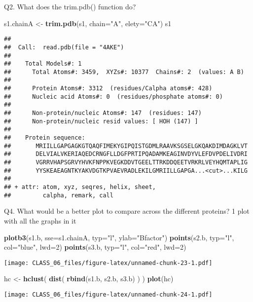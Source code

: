 \documentclass[
]{article}
\newenvironment{Shaded}{\begin{snugshade}}{\end{snugshade}}
\newcommand{\DataTypeTok}[1]{\textcolor[rgb]{0.13,0.29,0.53}{#1}}
\newcommand{\DecValTok}[1]{\textcolor[rgb]{0.00,0.00,0.81}{#1}}
\newcommand{\KeywordTok}[1]{\textcolor[rgb]{0.13,0.29,0.53}{\textbf{#1}}}
\newcommand{\NormalTok}[1]{#1}
\newcommand{\StringTok}[1]{\textcolor[rgb]{0.31,0.60,0.02}{#1}}
\begin{document}
Q2. What does the trim.pdb() function do?

\begin{Shaded}
\begin{Highlighting}[]
\NormalTok{s1.chainA <-}\StringTok{ }\KeywordTok{trim.pdb}\NormalTok{(s1, }\DataTypeTok{chain=}\StringTok{"A"}\NormalTok{, }\DataTypeTok{elety=}\StringTok{"CA"}\NormalTok{)}
\NormalTok{s1}
\end{Highlighting}
\end{Shaded}

\begin{verbatim}
## 
##  Call:  read.pdb(file = "4AKE")
## 
##    Total Models#: 1
##      Total Atoms#: 3459,  XYZs#: 10377  Chains#: 2  (values: A B)
## 
##      Protein Atoms#: 3312  (residues/Calpha atoms#: 428)
##      Nucleic acid Atoms#: 0  (residues/phosphate atoms#: 0)
## 
##      Non-protein/nucleic Atoms#: 147  (residues: 147)
##      Non-protein/nucleic resid values: [ HOH (147) ]
## 
##    Protein sequence:
##       MRIILLGAPGAGKGTQAQFIMEKYGIPQISTGDMLRAAVKSGSELGKQAKDIMDAGKLVT
##       DELVIALVKERIAQEDCRNGFLLDGFPRTIPQADAMKEAGINVDYVLEFDVPDELIVDRI
##       VGRRVHAPSGRVYHVKFNPPKVEGKDDVTGEELTTRKDDQEETVRKRLVEYHQMTAPLIG
##       YYSKEAEAGNTKYAKVDGTKPVAEVRADLEKILGMRIILLGAPGA...<cut>...KILG
## 
## + attr: atom, xyz, seqres, helix, sheet,
##         calpha, remark, call
\end{verbatim}

Q4. What would be a better plot to compare across the different
proteins? 1 plot with all the graphs in it

\begin{Shaded}
\begin{Highlighting}[]
\KeywordTok{plotb3}\NormalTok{(s1.b, }\DataTypeTok{sse=}\NormalTok{s1.chainA, }\DataTypeTok{typ=}\StringTok{"l"}\NormalTok{, }\DataTypeTok{ylab=}\StringTok{"Bfactor"}\NormalTok{)}
\KeywordTok{points}\NormalTok{(s2.b, }\DataTypeTok{typ=}\StringTok{"l"}\NormalTok{, }\DataTypeTok{col=}\StringTok{"blue"}\NormalTok{, }\DataTypeTok{lwd=}\DecValTok{2}\NormalTok{)}
\KeywordTok{points}\NormalTok{(s3.b, }\DataTypeTok{typ=}\StringTok{"l"}\NormalTok{, }\DataTypeTok{col=}\StringTok{"red"}\NormalTok{, }\DataTypeTok{lwd=}\DecValTok{2}\NormalTok{)}
\end{Highlighting}
\end{Shaded}

\texttt{[image: CLASS\_06\_files/figure-latex/unnamed-chunk-23-1.pdf]}

\begin{Shaded}
\begin{Highlighting}[]
\NormalTok{hc <-}\StringTok{ }\KeywordTok{hclust}\NormalTok{( }\KeywordTok{dist}\NormalTok{( }\KeywordTok{rbind}\NormalTok{(s1.b, s2.b, s3.b) ) )}
\KeywordTok{plot}\NormalTok{(hc)}
\end{Highlighting}
\end{Shaded}

\texttt{[image: CLASS\_06\_files/figure-latex/unnamed-chunk-24-1.pdf]}
\end{document}
